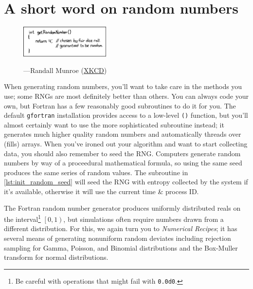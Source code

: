 \chapter{A short word on random numbers}
\label{chap:Random numbers}
\begin{figure}[h!]
  \centering
  \includegraphics[width=0.4\textwidth]{figures/random_number.png}

  \hspace*{\fill}---Randall Munroe (\href{http://xkcd.com/221/}{XKCD})
\end{figure}
When generating random numbers, you'll want to take care in the methods you use; some RNGs are most definitely better than others.
You can always code your own, but Fortran has a few reasonably good subroutines to do it for you.
The default \texttt{gfortran} installation provides access to a low-level \texttt{()} function, but you'll almost certainly want to use the more sophisticated  subroutine instead; it generates much higher quality random numbers and automatically threads over (fills) arrays.
When you've ironed out your algorithm and want to start collecting data, you should also remember to seed the RNG.
Computers generate random numbers by way of a proceedural mathematical formula, so using the same seed produces the same series of random values.
The subroutine in \autoref{lst:init_random_seed} will seed the RNG with entropy collected by the system if it's available, otherwise it will use the current time \& process ID.


The Fortran random number generator produces uniformly distributed reals on the interval\footnote{Be careful with operations that might fail with \texttt{0.0d0}.} $\left[0, 1\right)$, but simulations often require numbers drawn from a different distribution. 
For this, we again turn you to \emph{Numerical Recipes}; it has several means of generating nonuniform random deviates including rejection sampling for Gamma, Poisson, and Binomial distributions and the Box-Muller transform for normal distributions. 

